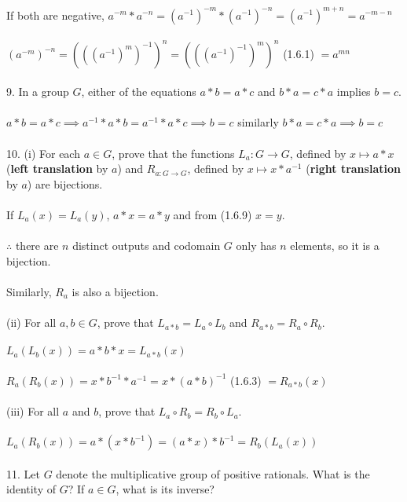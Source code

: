 \documentclass{article}
\begin{document}
\begin{siderules}
\null\qquad If both are negative, \(a^{-m}*a^{-n}=(a^{-1})^{-m}*(a^{-1})^{-n}=(a^{-1})^{m+n}=a^{-m-n}\)\\\\
\null\qquad \((a^{-m})^{-n}=(((a^{-1})^{m})^{-1})^{n}=(((a^{-1})^{-1})^{m})^{n}\) \color{gray} (1.6.1) \color{black}\(=a^{mn}\)\\\\
\color{blue}9. In a group \(G\), either of the equations \(a*b=a*c\) and \(b*a=c*a\) implies \(b=c\). \color{black}\\\\
\null\qquad \(a*b=a*c\implies a^{-1}*a*b=a^{-1}*a*c\implies b=c\) similarly \(b*a=c*a\implies b=c\)\\\\
\color{blue}10. (i) For each \(a\in G\), prove that the functions \(L_{a}:G\to G\), defined by \(x\mapsto a*x\) (\textbf{left translation} by \(a\)) and \(R_{a:G\to G}\), defined by \(x\mapsto x*a^{-1}\) (\textbf{right translation} by \(a\)) are bijections.\color{black}\\\\
\null\qquad If \(L_{a}(x)=L_{a}(y)\), \(a*x=a*y\) and from \color{gray} (1.6.9) \color{black} \(x=y\).\\\\
\null\qquad \(\therefore\) there are \(n\) distinct outputs and codomain \(G\) only has \(n\) elements, so it is a bijection.\\\\
\null\qquad Similarly, \(R_{a}\) is also a bijection.\\\\
\color{blue}(ii) For all \(a,b\in G\), prove that \(L_{a*b}=L_{a}\circ L_{b}\) and \(R_{a*b}=R_{a}\circ R_{b}\).\color{black}\\\\
\null\qquad \(L_{a}(L_{b}(x))=a*b*x=L_{a*b}(x)\)\\\\
\null\qquad \(R_{a}(R_{b}(x))=x*b^{-1}*a^{-1}=x*(a*b)^{-1}\) \color{gray}(1.6.3)  \color{black}\(=R_{a*b}(x)\)\\\\
\color{blue}(iii) For all \(a\) and \(b\), prove that \(L_{a}\circ R_{b}=R_{b}\circ L_{a}\). \color{black}\\\\
\null\qquad \(L_{a}(R_{b}(x))=a*(x*b^{-1})=(a*x)*b^{-1}=R_{b}(L_{a}(x))\)\\\\
\color{blue}11. Let \(G\) denote the multiplicative group of positive rationals. What is the identity of \(G\)? If \(a\in G\), what is its inverse? \color{black}\\\\

\end{siderules}
\end{document}
